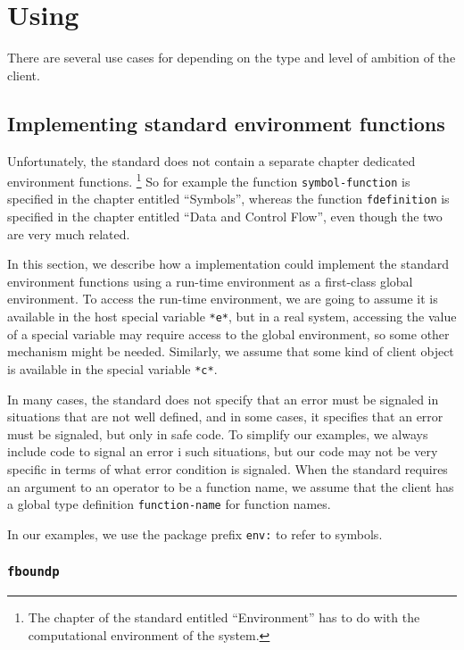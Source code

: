 \chapter{Using \sysname{}}

There are several use cases for \sysname{} depending on the type and
level of ambition of the client.

\section{Implementing standard environment functions}

Unfortunately, the \commonlisp{} standard does not contain a separate
chapter dedicated environment functions.%
\footnote{The chapter of the standard
  entitled ``Environment'' has to do with the computational environment
  of the \commonlisp{} system.}
So for example the function \texttt{symbol-function} is specified in
the chapter entitled ``Symbols'', whereas the function
\texttt{fdefinition} is specified in the chapter entitled ``Data and
Control Flow'', even though the two are very much related.

In this section, we describe how a \commonlisp{} implementation could
implement the standard environment functions using a \sysname{}
run-time environment as a first-class global environment.  To access
the \sysname{} run-time environment, we are going to assume it is
available in the host special variable \texttt{*e*}, but in
a real system, accessing the value of a special variable may require
access to the global environment, so some other mechanism might be
needed.  Similarly, we assume that some kind of client object is
available in the special variable \texttt{*c*}.

In many cases, the \commonlisp{} standard does not specify that an
error must be signaled in situations that are not well defined, and in
some cases, it specifies that an error must be signaled, but only in
safe code.  To simplify our examples, we always include code to signal
an error i such situations, but our code may not be very specific in
terms of what error condition is signaled.  When the standard requires
an argument to an operator to be a function name, we assume that the
client has a global type definition \texttt{function-name} for
function names.

In our examples, we use the package prefix \texttt{env:} to refer to
\sysname{} symbols.

\subsection{\texttt{fboundp}}

